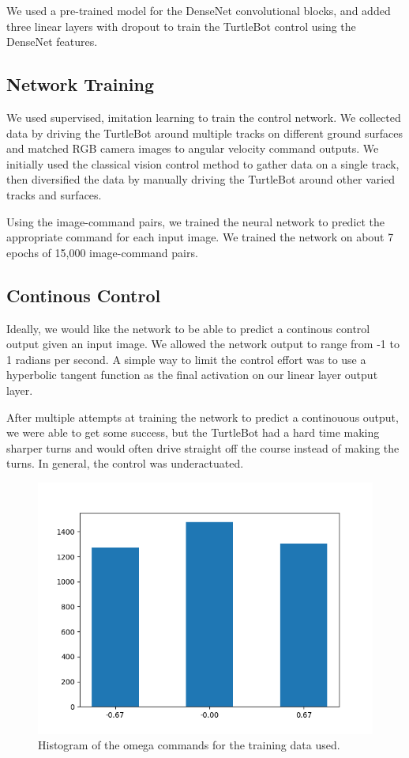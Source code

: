We used a pre-trained model for the DenseNet convolutional blocks, and added three linear layers with dropout to train the TurtleBot control using the DenseNet features.

\subsection{Network Training}
We used supervised, imitation learning to train the control network. We
collected data by driving the TurtleBot around multiple tracks on different
ground surfaces and matched RGB camera images to angular velocity command
outputs. We initially used the classical vision control method to gather data on
a single track, then diversified the data by manually driving the TurtleBot around other varied tracks and surfaces.

Using the image-command pairs, we trained the neural network to predict the
appropriate command for each input image. We trained the network on about 7
epochs of 15,000 image-command pairs.

\subsection{Continous Control}
Ideally, we would like the network to be able to predict a continous control
output given an input image. We allowed the network output to range from -1 to 1
radians per second. A simple way to limit the control effort was to use a
hyperbolic tangent function as the final activation on our linear layer output
layer.

After multiple attempts at training the network to predict a continouous output,
we were able to get some success, but the TurtleBot had a hard time making sharper turns and would often drive straight off the course instead of making the turns. In general, the control was underactuated.

\begin{figure}[hbt]
  \includegraphics[width=\columnwidth]{figures/data_histogram}
  \caption{Histogram of the omega commands for the training data used.}
  \label{fig:data_hist}
\end{figure}

